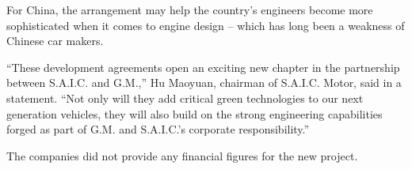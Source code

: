 ﻿\documentclass[12pt]{article}
\begin{document}
For China, the arrangement may help the country's engineers become more sophisticated when it comes
to engine design -- which has long been a weakness of Chinese car makers.

``These development agreements open an exciting new chapter in the partnership between S.A.I.C. and
G.M.,'' Hu Maoyuan, chairman of S.A.I.C. Motor, said in a statement. ``Not only will they add
critical green technologies to our next generation vehicles, they will also build on the strong
engineering capabilities forged as part of G.M. and S.A.I.C.'s corporate responsibility.''

The companies did not provide any financial figures for the new project.


\end{document}
